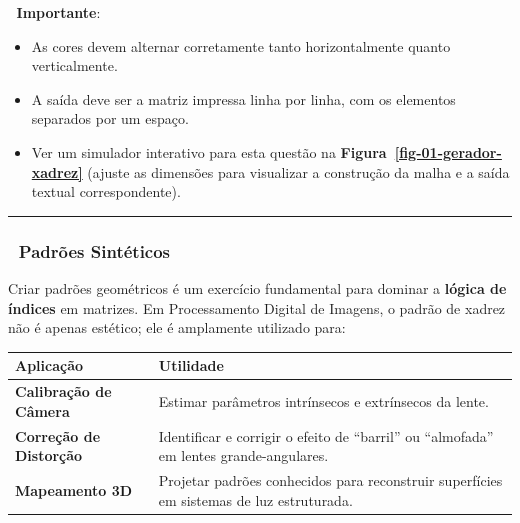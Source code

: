 \documentclass[
  portuguese,
  letterpaper,
  openany,
  oneside,
  12pt,
  a4paper]{book}
\providecommand{\tightlist}{%
  \setlength{\itemsep}{0pt}\setlength{\parskip}{0pt}}
\begin{document}
📌 \textbf{Importante}:

\begin{itemize}
\tightlist
\item
  As cores devem alternar corretamente tanto horizontalmente quanto
  verticalmente.
\item
  A saída deve ser a matriz impressa linha por linha, com os elementos
  separados por um espaço.
\item
  Ver um simulador interativo para esta questão na
  \textbf{Figura~\ref{fig-01-gerador-xadrez}} (ajuste as dimensões para
  visualizar a construção da malha e a saída textual correspondente).
\end{itemize}

\begin{center}\rule{0.5\linewidth}{0.5pt}\end{center}

\subsubsection{🧠 Padrões Sintéticos}\label{padruxf5es-sintuxe9ticos}

Criar padrões geométricos é um exercício fundamental para dominar a
\textbf{lógica de índices} em matrizes. Em Processamento Digital de
Imagens, o padrão de xadrez não é apenas estético; ele é amplamente
utilizado para:

\begin{longtable}[]{@{}
  >{\raggedright\arraybackslash}p{}
  >{\raggedright\arraybackslash}p{}@{}}
\toprule\noalign{}
\begin{minipage}[b]{\linewidth}\raggedright
Aplicação
\end{minipage} & \begin{minipage}[b]{\linewidth}\raggedright
Utilidade
\end{minipage} \\
\midrule\noalign{}
\endhead
\bottomrule\noalign{}
\endlastfoot
\textbf{Calibração de Câmera} & Estimar parâmetros intrínsecos e
extrínsecos da lente. \\
\textbf{Correção de Distorção} & Identificar e corrigir o efeito de
``barril'' ou ``almofada'' em lentes grande-angulares. \\
\textbf{Mapeamento 3D} & Projetar padrões conhecidos para reconstruir
superfícies em sistemas de luz estruturada. \\
\end{longtable}
\end{document}
